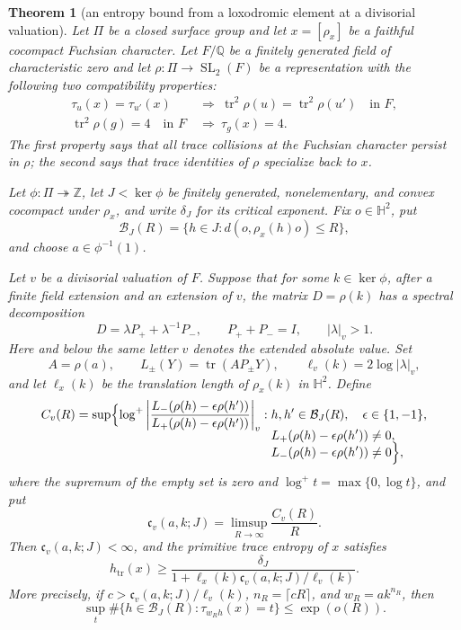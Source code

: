 \documentclass[11pt,reqno]{amsart}
\newtheorem{theorem}{Theorem}[section]
\theoremstyle{definition}
\theoremstyle{remark}
\newcommand{\Q}{\mathbb Q}
\newcommand{\Z}{\mathbb Z}
\newcommand{\Tr}{\operatorname{tr}}
\newcommand{\SL}{\operatorname{SL}}
\begin{document}
\begin{theorem}[an entropy bound from a loxodromic element at a divisorial valuation]
\label{thm:moving-divisorial-multiplier}
Let \(\Pi\) be a closed surface group and let
\(x=[\rho_x]\) be a faithful cocompact Fuchsian character.  Let
\(F/\Q\) be a finitely generated field of characteristic zero and let
\(\rho\colon\Pi\to\SL_2(F)\) be a representation with the following two
compatibility properties:
\[
 \begin{split}
 \tau_u(x)=\tau_{u'}(x)
   &\ \Longrightarrow\
   \Tr^2\rho(u)=\Tr^2\rho(u')\quad\text{in }F,\\
 \Tr^2\rho(g)=4\quad\text{in }F
   &\ \Longrightarrow\ \tau_g(x)=4.
 \end{split}
\]
The first property says that all trace collisions at the Fuchsian
character persist in \(\rho\); the second says that trace identities of
\(\rho\) specialize back to \(x\).

Let \(\phi\colon\Pi\twoheadrightarrow\Z\), let
\(J<\ker\phi\) be finitely generated, nonelementary, and convex cocompact
under \(\rho_x\), and write \(\delta_J\) for its critical exponent.  Fix
\(o\in\mathbb H^2\), put
\[
 \mathcal B_J(R)=\{h\in J:d(o,\rho_x(h)o)\le R\},
\]
and choose \(a\in\phi^{-1}(1)\).

Let \(v\) be a divisorial valuation of \(F\).  Suppose that for some
\(k\in\ker\phi\), after a finite field extension and an extension of \(v\),
the matrix \(D=\rho(k)\) has a spectral decomposition
\[
 D=\lambda P_++\lambda^{-1}P_-,
 \qquad P_++P_-=I,\qquad |\lambda|_v>1.
\]
Here and below the same letter \(v\) denotes the extended absolute value.
Set
\[
 A=\rho(a),\qquad
 L_\pm(Y)=\Tr(AP_\pm Y),\qquad
 \ell_v(k)=2\log|\lambda|_v,
\]
and let \(\ell_x(k)\) be the translation length of \(\rho_x(k)\) in
\(\mathbb H^2\).  Define
\[
 \begin{split}
 C_v(R)=\sup\Bigl\{\log^+\left|
 \frac{L_-(\rho(h)-\epsilon\rho(h'))}
      {L_+(\rho(h)-\epsilon\rho(h'))}
 \right|_v:\;&h,h'\in\mathcal B_J(R),\quad
 \epsilon\in\{1,-1\},\\[-2mm]
 &L_+(\rho(h)-\epsilon\rho(h'))\ne0,\\[-2mm]
 &L_-(\rho(h)-\epsilon\rho(h'))\ne0
 \Bigr\},
 \end{split}
\]
where the supremum of the empty set is zero and
\(\log^+t=\max\{0,\log t\}\), and put
\[
 \mathfrak c_v(a,k;J)=
 \limsup_{R\to\infty}\frac{C_v(R)}R.
\]
Then \(\mathfrak c_v(a,k;J)<\infty\), and the primitive trace entropy of
\(x\) satisfies
\[
 h_{\Tr}(x)\ge
 \frac{\delta_J}
 {1+\ell_x(k)\mathfrak c_v(a,k;J)/\ell_v(k)}.
\]
More precisely, if
\(c>\mathfrak c_v(a,k;J)/\ell_v(k)\),
\(n_R=\lceil cR\rceil\), and \(w_R=ak^{n_R}\), then
\[
 \sup_t\#\{h\in\mathcal B_J(R):\tau_{w_Rh}(x)=t\}
 \le\exp(o(R)).
\]
\end{theorem}
\end{document}
